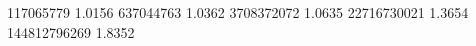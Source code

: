 117065779    1.0156
637044763    1.0362
3708372072   1.0635
22716730021  1.3654
144812796269 1.8352
